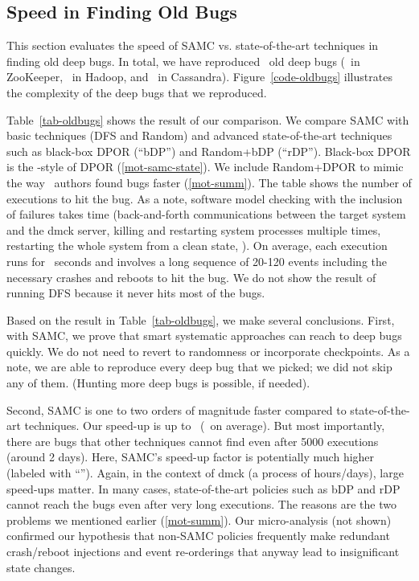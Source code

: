 


\subsection{Speed in Finding Old Bugs}
\label{eval-oldbugs}






This section evaluates the speed of SAMC vs. state-of-the-art
techniques in finding old deep bugs.  In total, we have reproduced
\numOldDeepBugs\ old deep bugs (\numZkDeepBugs\ in ZooKeeper,
\numMrDeepBugs\ in Hadoop, and \numCsDeepBugs\ in Cassandra).
Figure~\ref{code-oldbugs} illustrates the complexity of the deep bugs
that we reproduced.



Table~\ref{tab-oldbugs} shows the result of our comparison.  We
compare SAMC with basic techniques (DFS and Random) and advanced
state-of-the-art techniques such as black-box DPOR (``bDP'') and
Random+bDP (``rDP'').  Black-box DPOR is the \modist-style of DPOR
(\sec\ref{mot-samc-state}).  We include Random+DPOR to mimic the way
\modist\ authors found bugs faster (\sec\ref{mot-summ}).  The table
shows the number of executions to hit the bug.  As a note,
software model checking with the inclusion of failures
takes time (back-and-forth communications between the target system
and the dmck server, killing and restarting system processes multiple
times, restarting the whole system from a clean state, \etc).  On
average, each execution runs for \numAvgExecTime\ seconds and involves
a long sequence of 20-120 events including the necessary crashes and
reboots to hit the bug.  We do not show the result of running DFS
because it never hits most of the bugs.  


Based on the result in Table~\ref{tab-oldbugs}, we make several
conclusions.
%
First, with SAMC, we prove that smart systematic approaches can reach
to deep bugs quickly.  We do not need to revert to randomness or
incorporate checkpoints.  As a note, we are able to reproduce every
deep bug that we picked; we did not skip any of them.
%
(Hunting more deep bugs is possible, if needed).

Second, SAMC is one to two orders of magnitude faster compared to
state-of-the-art techniques.  Our speed-up is up to
\numMaxBugSpeedUp\ (\numAvgBugSpeedUp\ on average).  But most
importantly, there are bugs that other techniques cannot find even
after 5000 executions (around 2 days). Here, SAMC's speed-up factor is
potentially much higher (labeled with ``\uu'').  Again, in the context of
dmck (a process of hours/days), large speed-ups matter.  In many
cases, state-of-the-art policies such as bDP and rDP cannot reach the
bugs even after very long executions.  The reasons are the two
problems we mentioned earlier (\sec\ref{mot-summ}).  Our
micro-analysis (not shown) confirmed our hypothesis that non-SAMC
policies frequently make redundant crash/reboot injections and event
re-orderings that anyway lead to insignificant state changes.

